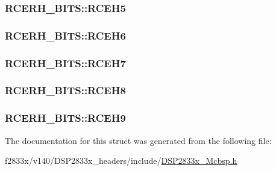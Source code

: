 \subsubsection[{R\+C\+E\+H5}]{ R\+C\+E\+R\+H\+\_\+\+B\+I\+T\+S\+::\+R\+C\+E\+H5}\label{struct_r_c_e_r_h___b_i_t_s_ac829a17d30312458bd663673ddeb8dba}
\hypertarget{struct_r_c_e_r_h___b_i_t_s_a030be8564cdd0caaa765310e7d4deef3}{}
\subsubsection[{R\+C\+E\+H6}]{ R\+C\+E\+R\+H\+\_\+\+B\+I\+T\+S\+::\+R\+C\+E\+H6}\label{struct_r_c_e_r_h___b_i_t_s_a030be8564cdd0caaa765310e7d4deef3}
\hypertarget{struct_r_c_e_r_h___b_i_t_s_a788e60e5a7c6b8317bfdf977ff8b7e3c}{}
\subsubsection[{R\+C\+E\+H7}]{ R\+C\+E\+R\+H\+\_\+\+B\+I\+T\+S\+::\+R\+C\+E\+H7}\label{struct_r_c_e_r_h___b_i_t_s_a788e60e5a7c6b8317bfdf977ff8b7e3c}
\hypertarget{struct_r_c_e_r_h___b_i_t_s_a686faf6213e349df3de9ccbb2f3fb60b}{}
\subsubsection[{R\+C\+E\+H8}]{ R\+C\+E\+R\+H\+\_\+\+B\+I\+T\+S\+::\+R\+C\+E\+H8}\label{struct_r_c_e_r_h___b_i_t_s_a686faf6213e349df3de9ccbb2f3fb60b}
\hypertarget{struct_r_c_e_r_h___b_i_t_s_a3d5c1ce77c029d319313110449e90cc4}{}
\subsubsection[{R\+C\+E\+H9}]{ R\+C\+E\+R\+H\+\_\+\+B\+I\+T\+S\+::\+R\+C\+E\+H9}\label{struct_r_c_e_r_h___b_i_t_s_a3d5c1ce77c029d319313110449e90cc4}


The documentation for this struct was generated from the following file\+:\begin{DoxyCompactItemize}
\item 
f2833x/v140/\+D\+S\+P2833x\+\_\+headers/include/\hyperlink{_d_s_p2833x___mcbsp_8h}{D\+S\+P2833x\+\_\+\+Mcbsp.\+h}\end{DoxyCompactItemize}
